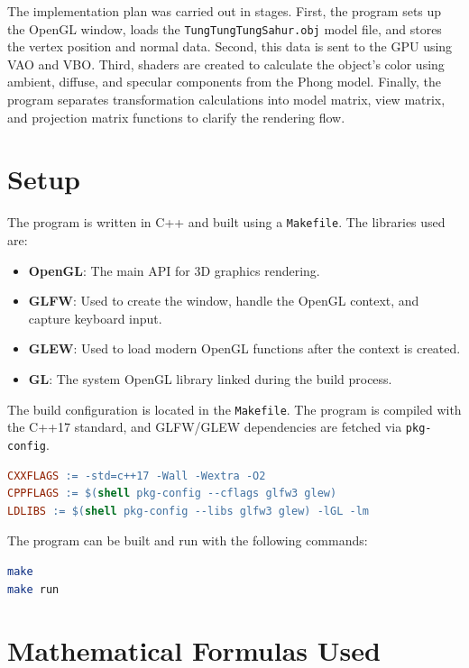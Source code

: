 \documentclass[12pt,a4paper]{article}
\begin{document}
The implementation plan was carried out in stages. First, the program sets up
the OpenGL window, loads the \texttt{TungTungTungSahur.obj} model file, and stores
the vertex position and normal data. Second, this data is sent to the GPU using
VAO and VBO. Third, shaders are created to calculate the object's color using
ambient, diffuse, and specular components from the Phong model. Finally, the
program separates transformation calculations into model matrix, view matrix,
and projection matrix functions to clarify the rendering flow.

\section{Setup}

The program is written in C++ and built using a \texttt{Makefile}. The libraries
used are:

\begin{itemize}
    \item \textbf{OpenGL}: The main API for 3D graphics rendering.
    \item \textbf{GLFW}: Used to create the window, handle the OpenGL context,
    and capture keyboard input.
    \item \textbf{GLEW}: Used to load modern OpenGL functions after the context is created.
    \item \textbf{GL}: The system OpenGL library linked during the build process.
\end{itemize}

The build configuration is located in the \texttt{Makefile}. The program is
compiled with the C++17 standard, and GLFW/GLEW dependencies are fetched via \texttt{pkg-config}.

\begin{lstlisting}[language=make]
CXXFLAGS := -std=c++17 -Wall -Wextra -O2
CPPFLAGS := $(shell pkg-config --cflags glfw3 glew)
LDLIBS := $(shell pkg-config --libs glfw3 glew) -lGL -lm
\end{lstlisting}

The program can be built and run with the following commands:

\begin{lstlisting}[language=bash]
make
make run
\end{lstlisting}

\section{Mathematical Formulas Used}
\end{document}

